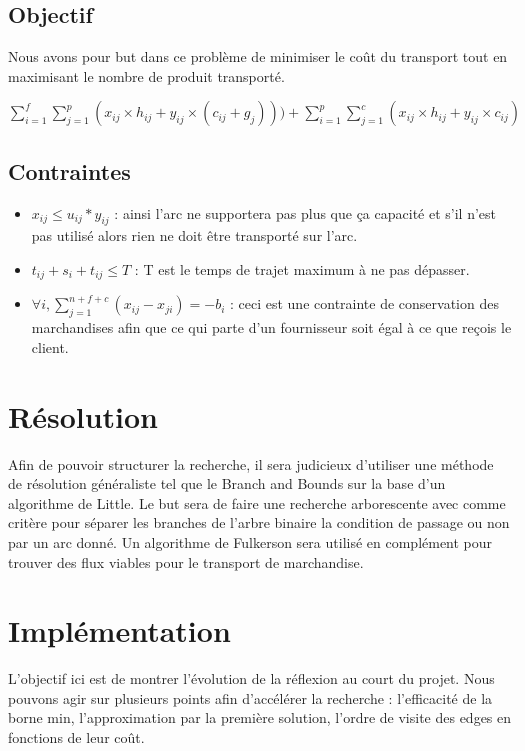 \documentclass[french]{article}
\begin{document}
	\subsection{Objectif}
	Nous avons pour but dans ce problème de minimiser le coût du transport tout en maximisant le nombre de produit transporté.
	
	$\sum_{i=1}^{f} \sum_{j=1}^{p}(x_{ij} \times h_{ij} + y_{ij} \times (c_{ij} + g_{j}))) + \sum_{i=1}^{p} \sum_{j=1}^{c}(x_{ij} \times h_{ij} + y_{ij} \times c_{ij}) $
	
	\subsection{Contraintes}
	\begin{itemize}
		\item $x_{ij} \leq u_{ij} * y_{ij}$ : ainsi l'arc ne supportera pas plus que ça capacité et s'il n'est pas utilisé alors rien ne doit être transporté sur l'arc.
		\item $t_{ij} + s_{i} + t_{ij} \leq T$ : T est le temps de trajet maximum à ne pas dépasser. 
		\item $\forall i, \sum_{j=1}^{n+f+c}(x_{ij} - x_{ji}) = - b_{i}$ : ceci est une contrainte de conservation des marchandises afin que ce qui parte d'un fournisseur soit égal à ce que reçois le client.
	\end{itemize}
	
\section{Résolution}
Afin de pouvoir structurer la recherche, il sera judicieux d'utiliser une méthode de résolution généraliste tel que le Branch and Bounds sur la base d'un algorithme de Little. Le but sera de faire une recherche arborescente avec comme critère pour séparer les branches de l'arbre binaire la condition de passage ou non par un arc donné.
Un algorithme de Fulkerson sera utilisé en complément pour trouver des flux viables pour le transport de marchandise.


\section{Implémentation}
L'objectif ici est de montrer l'évolution de la réflexion au court du projet. Nous pouvons agir sur plusieurs points afin d'accélérer la recherche : l'efficacité de la borne min, l'approximation par la première solution, l'ordre de visite des edges en fonctions de leur coût.
\end{document}
